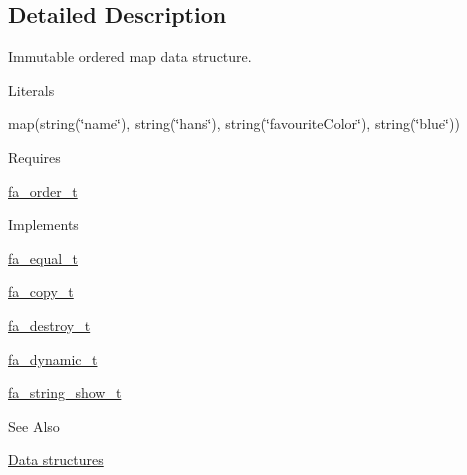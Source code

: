 \subsection{Detailed Description}
Immutable ordered map data structure. \begin{DoxyParagraph}{Literals}

\begin{DoxyItemize}
\item {\ttfamily map(string(\char`\"{}name\char`\"{}), string(\char`\"{}hans\char`\"{}), string(\char`\"{}favourite\-Color\char`\"{}), string(\char`\"{}blue\char`\"{}))}
\end{DoxyItemize}
\end{DoxyParagraph}
\begin{DoxyParagraph}{Requires }

\begin{DoxyItemize}
\item \hyperlink{structfa__order__t}{fa\-\_\-order\-\_\-t}
\end{DoxyItemize}
\end{DoxyParagraph}
\begin{DoxyParagraph}{Implements }

\begin{DoxyItemize}
\item \hyperlink{structfa__equal__t}{fa\-\_\-equal\-\_\-t}
\item \hyperlink{structfa__copy__t}{fa\-\_\-copy\-\_\-t}
\item \hyperlink{structfa__destroy__t}{fa\-\_\-destroy\-\_\-t}
\item \hyperlink{structfa__dynamic__t}{fa\-\_\-dynamic\-\_\-t}
\item \hyperlink{structfa__string__show__t}{fa\-\_\-string\-\_\-show\-\_\-t}
\end{DoxyItemize}
\end{DoxyParagraph}
\begin{DoxySeeAlso}{See Also}

\begin{DoxyItemize}
\item \hyperlink{md__data_structures_DataStructures}{Data structures} 
\end{DoxyItemize}
\end{DoxySeeAlso}


